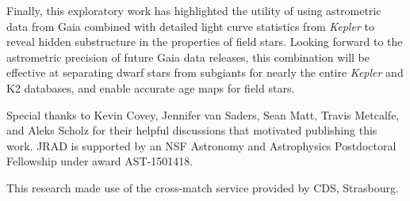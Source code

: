 \documentclass[manuscript, letterpaper]{aastex6}
\newcommand{\Kepler}{\textsl{Kepler}\xspace}
\begin{document}
Finally, this exploratory work has highlighted the utility of using astrometric data from Gaia combined with detailed light curve statistics from \Kepler to reveal hidden substructure in the properties of field stars. Looking forward to the astrometric precision of future Gaia data releases, this combination will be effective at separating dwarf stars from subgiants for nearly the entire \Kepler and K2 databases, and enable accurate age maps for field stars.



\acknowledgments
Special thanks to Kevin Covey, Jennifer van Saders, Sean Matt, Travis Metcalfe, and Aleks Scholz for their helpful discussions that motivated publishing this work. JRAD is supported by an NSF Astronomy and Astrophysics Postdoctoral Fellowship under award AST-1501418.

This research made use of the cross-match service provided by CDS, Strasbourg.


\end{document}
